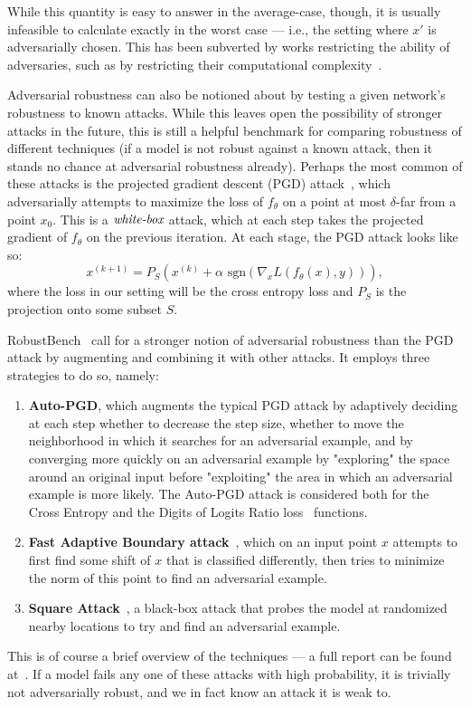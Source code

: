 While this quantity is easy to answer in the average-case, though, it is usually infeasible to calculate exactly in the worst case — i.e., the setting where $x'$ is adversarially chosen. This has been subverted by works restricting the ability of adversaries, such as by restricting their computational complexity~\cite{Garg2020ComputationalRobustness}. 

Adversarial robustness can also be notioned about by testing a given network's robustness to known attacks. While this leaves open the possibility of stronger attacks in the future, this is still a helpful benchmark for comparing robustness of different techniques (if a model is not robust against a known attack, then it stands no chance at adversarial robustness already). Perhaps the most common of these attacks is the projected gradient descent (PGD) attack~\cite{Madry2017Robust}, which adversarially attempts to maximize the loss of $f_\theta$ on a point at most $\delta$-far from a point $x_0$. This is a $\emph{white-box}$ attack, which at each step takes the projected gradient of $f_\theta$ on the previous iteration. At each stage, the PGD attack looks like so:
$$
x^{(k+1)} = P_{S} (x^{(k)} + \alpha\text{ sgn}(\nabla_x L(f_\theta(x), y))),
$$
where the loss in our setting will be the cross entropy loss and $P_S$ is the projection onto some subset $S$.

RobustBench~\cite{Croce2020RobustBench} call for a stronger notion of adversarial robustness than the PGD attack by augmenting and combining it with other attacks. It employs three strategies to do so, namely:
\begin{enumerate}
    \item {\bf Auto-PGD}, which augments the typical PGD attack by adaptively deciding at each step whether to decrease the step size, whether to move the neighborhood in which it searches for an adversarial example, and by converging more quickly on an adversarial example by "exploring" the space around an original input before "exploiting" the area in which an adversarial example is more likely. The Auto-PGD attack is considered both for the Cross Entropy and the Digits of Logits Ratio loss~\cite{Croce2020AutoAttack} functions.
    \item {\bf Fast Adaptive Boundary attack}~\cite{Croce2019FAB}, which on an input point $x$ attempts to first find some shift of $x$ that is classified differently, then tries to minimize the norm of this point to find an adversarial example. 
    \item {\bf Square Attack}~\cite{Andriushchenko2019SquareAttack}, a black-box attack that probes the model at randomized nearby locations to try and find an adversarial example.
\end{enumerate}
This is of course a brief overview of the techniques — a full report can be found at~\cite{Croce2020AutoAttack}. If a model fails any one of these attacks with high probability, it is trivially not adversarially robust, and we in fact know an attack it is weak to. 

